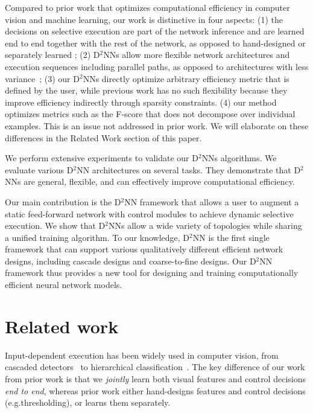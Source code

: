 \documentclass[10pt,twocolumn,letterpaper]{article}
\begin{document}
Compared to prior work that optimizes computational efficiency in computer vision and
machine learning, our work is distinctive in four aspects: (1) the decisions
on selective execution are part of the network inference and are learned end to
end together with the rest of the network, as opposed to hand-designed or separately
learned \cite{li2015convolutional,sun2013deep,DBLP:conf/icml/AlmahairiBCZLC16};
(2) D$^2$NNs allow more flexible network architectures and execution sequences
including parallel paths, as opposed to architectures with less variance~\cite{denoyer2014deep,shazeer2017outrageously}; 
(3) our D$^2$NNs directly optimize arbitrary efficiency metric that is defined by the user, while previous work has no
such flexibility because they improve efficiency indirectly through sparsity constraints\cite{bengio2015conditional,bengio2013estimating,shazeer2017outrageously}.
(4) our method optimizes metrics such as the F-score that does not decompose
over individual examples. This is an issue not addressed in prior work. We will elaborate on
these differences in the Related Work section of this paper. 

We perform extensive experiments to validate our D$^2$NNs algorithms. We evaluate various D$^2$NN architectures on several tasks. They demonstrate that D$^2$NNs are general, flexible, and can
effectively improve computational efficiency. 

Our main contribution is the D$^2$NN framework that allows a user to 
augment a static 
feed-forward network with control modules to achieve dynamic selective
execution. We show that D$^2$NNs allow a wide variety of topologies while sharing a unified
training algorithm. 
To our knowledge, D$^2$NN is the first single framework that can support various qualitatively different efficient network designs, including cascade designs and coarse-to-fine designs. 
Our D$^2$NN framework thus
provides a new tool for designing and training computationally efficient neural network models. 

\section{Related work}\label{sec:relatedwork}

Input-dependent execution has been widely used in computer vision, from cascaded
detectors~\cite{viola2004robust,felzenszwalb2010cascade} to
hierarchical classification~\cite{deng2011fast,bengio2010label}. 
The key difference of our work from prior work is that we \emph{jointly} learn both visual features and control decisions
\emph{end to end},  whereas prior work either hand-designs features and control
decisions (e.g.\@ thresholding), or learns them separately. 
\end{document}
